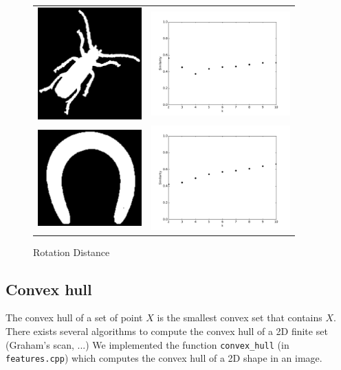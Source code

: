 \documentclass[a4paper, 11pt]{article}
\begin{document}
\begin{figure}[p]
\begin{tabular}{ll}
\includegraphics[width=4cm]{beetle.png} &
\includegraphics[height=4cm]{beetle-rotation.pdf} \\
\includegraphics[width=4cm]{horseshoe.png} &
\includegraphics[height=4cm]{horseshoe-rotation.pdf} \\
\end{tabular}
\caption{Rotation Distance}
\label{figure:rotation}
\end{figure}

\newpage
\subsection{Convex hull}

The convex hull of a set of point $X$ is the smallest convex set that contains $X$. There exists several algorithms to compute the convex hull of a 2D finite set (Graham's scan, ...)
We implemented the function \verb|convex_hull| (in \verb|features.cpp|)  which computes the convex hull of a 2D shape in an image.
\end{document}
